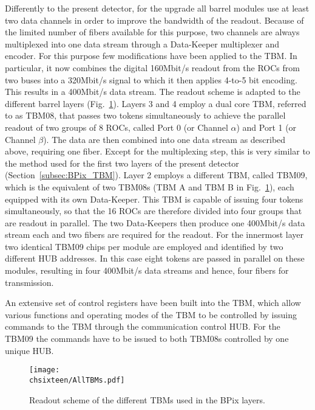 Differently to the present detector, for the upgrade all barrel modules use at least two data channels in order to improve the bandwidth of the readout.
Because of the limited number of fibers available for this purpose, two channels are always multiplexed into one data stream through a Data-Keeper multiplexer and encoder.
For this purpose few modifications have been applied to the TBM.
In particular, it now combines the digital 160\unit{Mbit/s} readout from the ROCs from two buses into a 320\unit{Mbit/s} signal to which it then applies 4-to-5 bit encoding. This results in a 400\unit{Mbit/s} data stream.
The readout scheme is adapted to the different barrel layers (Fig.~\ref{fig:Phase1TBMRO}).
Layers 3 and 4 employ a dual core TBM, referred to as TBM08, that passes two tokens simultaneously to achieve the parallel readout of two groups of 8 ROCs, called Port 0 (or Channel $\alpha$) and Port 1 (or Channel $\beta$). 
The data are then combined into one data stream as described above, requiring one fiber. Except for the multiplexing step, this is very similar to the method used for the first two layers of the present detector (Section~\ref{subsec:BPix_TBM}).
Layer 2 employs a different TBM, called TBM09, which is the equivalent of two TBM08s (TBM A and TBM B in Fig.~\ref{fig:Phase1TBMRO}), each equipped with its own Data-Keeper. This TBM is capable of issuing four tokens simultaneously, so that the 16 ROCs are therefore divided into four groups that are readout in parallel. The two Data-Keepers then produce one 400\unit{Mbit/s} data stream each and two fibers are required for the readout.
For the innermost layer two identical TBM09 chips per module are employed and identified by two different HUB addresses. In this case eight tokens are passed in parallel on these modules, resulting in four 400\unit{Mbit/s} data streams and hence, four fibers for transmission.

An extensive set of control registers have been built into the TBM, which allow various functions and operating modes of the TBM to be controlled by issuing commands to the TBM through the communication control HUB.
For the TBM09 the commands have to be issued to both TBM08s controlled by one unique HUB.

\begin{figure}[!htb]
 \begin{center}
 \texttt{[image: \\chsixteen/AllTBMs.pdf]}
 \end{center}
 \caption{Readout scheme of the different TBMs used in the BPix layers.}
 \label{fig:Phase1TBMRO}
\end{figure}

